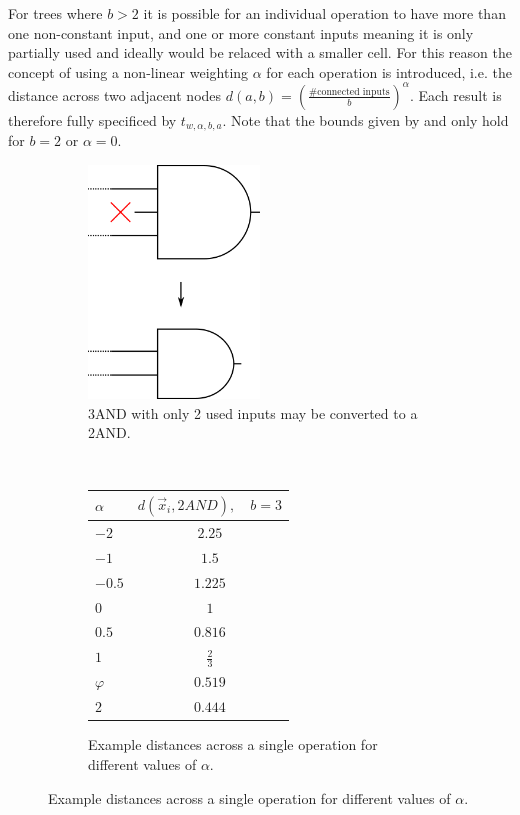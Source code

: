 \documentclass[11pt,twoside]{article}
\begin{document}
For trees where $b>2$ it is possible for an individual operation to have more
than one non-constant input, and one or more constant inputs meaning
it is only partially used and ideally would be relaced with a smaller cell.
For this reason the concept of using a non-linear weighting $\alpha$ for each
operation is introduced, i.e. the distance across two adjacent nodes
$d(a, b) = ( \frac{\text{\# connected inputs}}{b} )^\alpha$.
Each result is therefore fully specificed by $t_{w,\alpha,b,a}$.
Note that the bounds given by  and  only hold
for $b=2$ or $\alpha=0$.

\begin{figure}[h]
    \begin{subfigure}[b]{0.5\textwidth}
        \centering
        \includegraphics[width=0.5\textwidth]{alpha_demo.png}
        \caption{3AND with only 2 used inputs may be converted to a 2AND.
                 \label{fig:alpha_demo}}
    \end{subfigure}%
    ~
    \begin{subfigure}[b]{0.5\textwidth}
        \centering
        \begin{tabular}{ l | c }
            $\alpha$    & $d(\vec{x}_i, 2AND),\quad b=3$   \\
            \hline
            $-2$        & $2.25$        \\
            $-1$        & $1.5$         \\
            $-0.5$      & $1.225$       \\
            $0$         & $1$           \\
            $0.5$       & $0.816$       \\
            $1$         & $\frac{2}{3}$ \\
            $\varphi$   & $0.519$       \\
            $2$         & $0.444$       \\
        \end{tabular}
        \caption{Example distances across a single operation for different
            values of $\alpha$.
            \label{tab:alpha_values}}
    \end{subfigure}
\end{figure}
\end{document}
